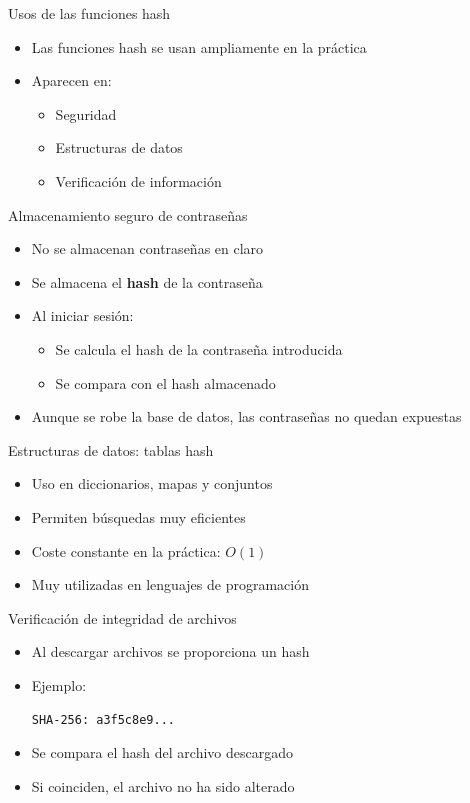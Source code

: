 \documentclass{beamer}
\begin{document}
\begin{frame}{Usos de las funciones hash}
\begin{itemize}
  \item Las funciones hash se usan ampliamente en la práctica
  \item Aparecen en:
  \begin{itemize}
    \item Seguridad
    \item Estructuras de datos
    \item Verificación de información
  \end{itemize}
\end{itemize}
\end{frame}

\begin{frame}{Almacenamiento seguro de contraseñas}
\begin{itemize}
  \item No se almacenan contraseñas en claro
  \item Se almacena el \textbf{hash} de la contraseña
  \item Al iniciar sesión:
  \begin{itemize}
    \item Se calcula el hash de la contraseña introducida
    \item Se compara con el hash almacenado
  \end{itemize}
  \item Aunque se robe la base de datos, las contraseñas no quedan expuestas
\end{itemize}
\end{frame}

\begin{frame}{Estructuras de datos: tablas hash}
\begin{itemize}
  \item Uso en diccionarios, mapas y conjuntos
  \item Permiten búsquedas muy eficientes
  \item Coste constante en la práctica: $O(1)$
  \item Muy utilizadas en lenguajes de programación
\end{itemize}
\end{frame}

\begin{frame}{Verificación de integridad de archivos}
\begin{itemize}
  \item Al descargar archivos se proporciona un hash
  \item Ejemplo:
  \begin{center}
    \texttt{SHA-256: a3f5c8e9...}
  \end{center}
  \item Se compara el hash del archivo descargado
  \item Si coinciden, el archivo no ha sido alterado
\end{itemize}
\end{frame}
\end{document}
